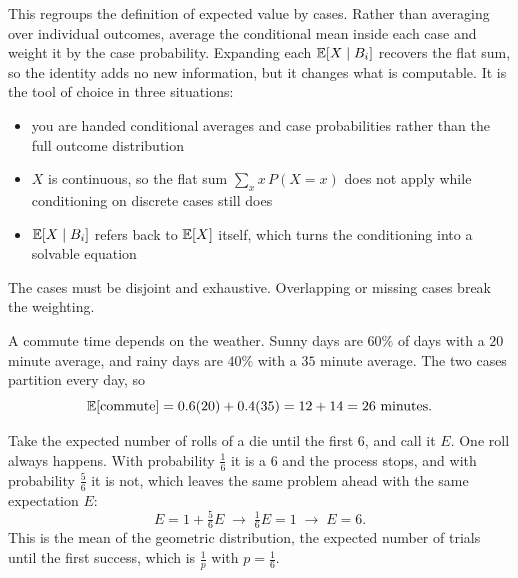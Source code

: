This regroups the definition of expected value by cases. Rather than averaging over individual outcomes, average the conditional mean inside each case and weight it by the case probability. Expanding each $\mathbb{E}[X \mid B_i]$ recovers the flat sum, so the identity adds no new information, but it changes what is computable. It is the tool of choice in three situations:
\begin{itemize}[itemsep=-1ex, label=--]
    \item you are handed conditional averages and case probabilities rather than the full outcome distribution
    \item $X$ is continuous, so the flat sum $\sum_x x \, P(X=x)$ does not apply while conditioning on discrete cases still does
    \item $\mathbb{E}[X \mid B_i]$ refers back to $\mathbb{E}[X]$ itself, which turns the conditioning into a solvable equation
\end{itemize}
The cases must be disjoint and exhaustive. Overlapping or missing cases break the weighting.

\begin{example}
A commute time depends on the weather. Sunny days are $60\%$ of days with a $20$ minute average, and rainy days are $40\%$ with a $35$ minute average. The two cases partition every day, so
\[
\mathbb{E}[\text{commute}] = 0.6(20) + 0.4(35) = 12 + 14 = 26 \text{ minutes.}
\]
\end{example}

\begin{example}
Take the expected number of rolls of a die until the first 6, and call it $E$. One roll always happens. With probability $\frac{1}{6}$ it is a 6 and the process stops, and with probability $\frac{5}{6}$ it is not, which leaves the same problem ahead with the same expectation $E$:
\[
E = 1 + \tfrac{5}{6}E \;\longrightarrow\; \tfrac{1}{6}E = 1 \;\longrightarrow\; E = 6.
\]
This is the mean of the geometric distribution, the expected number of trials until the first success, which is $\frac{1}{p}$ with $p = \frac{1}{6}$.
\end{example}

